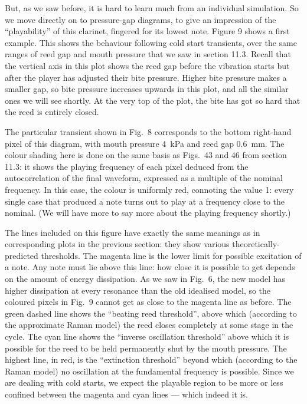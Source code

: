   But, as we saw before, it is hard to learn much from an individual 
  simulation. So we move directly on to pressure-gap diagrams, to give an 
  impression of the “playability” of this clarinet, fingered for its lowest 
  note. Figure 9 shows a first example. This shows the behaviour following cold 
  start transients, over the same ranges of reed gap and mouth pressure that we 
  saw in section 11.3. Recall that the vertical axis in this plot shows the 
  reed gap before the vibration starts but after the player has adjusted their 
  bite pressure. Higher bite pressure makes a smaller gap, so bite pressure 
  increases upwards in this plot, and all the similar ones we will see shortly. 
  At the very top of the plot, the bite has got so hard that the reed is 
  entirely closed. 

  The particular transient shown in Fig.\ 8 corresponds to the bottom 
  right-hand pixel of this diagram, with mouth pressure 4~kPa and reed gap 
  0.6~mm. The colour shading here is done on the same basis as Figs.\ 43 and 46 
  from section 11.3: it shows the playing frequency of each pixel deduced from 
  the autocorrelation of the final waveform, expressed as a multiple of the 
  nominal frequency. In this case, the colour is uniformly red, connoting the 
  value 1: every single case that produced a note turns out to play at a 
  frequency close to the nominal. (We will have more to say more about the 
  playing frequency shortly.) 

  The lines included on this figure have exactly the same meanings as in 
  corresponding plots in the previous section: they show various 
  theoretically-predicted thresholds. The magenta line is the lower limit for 
  possible excitation of a note. Any note must lie above this line: how close 
  it is possible to get depends on the amount of energy dissipation. As we saw 
  in Fig.\ 6, the new model has higher dissipation at every resonance than the 
  old idealised model, so the coloured pixels in Fig.\ 9 cannot get as close to 
  the magenta line as before. The green dashed line shows the “beating reed 
  threshold”, above which (according to the approximate Raman model) the reed 
  closes completely at some stage in the cycle. The cyan line shows the 
  “inverse oscillation threshold” above which it is possible for the reed to be 
  held permanently shut by the mouth pressure. The highest line, in red, is the 
  “extinction threshold” beyond which (according to the Raman model) no 
  oscillation at the fundamental frequency is possible. Since we are dealing 
  with cold starts, we expect the playable region to be more or less confined 
  between the magenta and cyan lines --- which indeed it is. 

